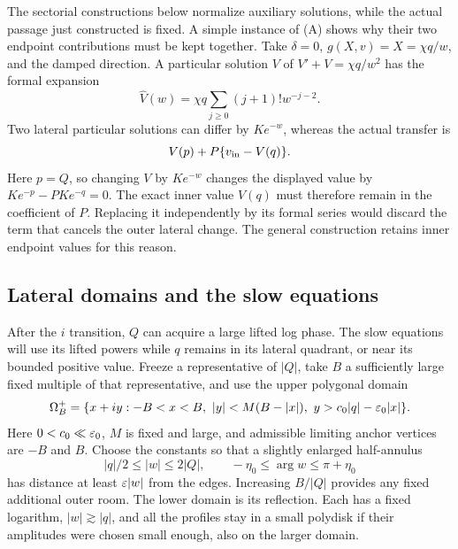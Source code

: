 The sectorial constructions below normalize auxiliary solutions, while
the actual passage just constructed is fixed.  A simple instance of (A)
shows why their two endpoint contributions must be kept together.  Take
$\delta=0$, $g(X,v)=X=\chi q/w$, and the damped direction.  A particular
solution $V$ of $V'+V=\chi q/w^2$ has the formal expansion
\[
 \widehat V(w)=\chi q\sum_{j\ge0}(j+1)!w^{-j-2}.
\]
Two lateral particular solutions can differ by $Ke^{-w}$, whereas the
actual transfer is
\begin{equation}\label{eq:additive-Stokes-cancellation}
 V(p)+P\{v_{\rm in}-V(q)\}.
\end{equation}
Here $p=Q$, so changing $V$ by $Ke^{-w}$ changes the displayed value
by $Ke^{-p}-PKe^{-q}=0$.  The exact inner value $V(q)$ must therefore
remain in the coefficient of $P$.  Replacing it independently by its
formal series would discard the term that cancels the outer lateral
change.  The general construction retains inner endpoint values for
this reason.

\subsection{Lateral domains and the slow equations}

After the $i$ transition, $Q$ can acquire a large lifted log phase.  The
slow equations will use its lifted powers while $q$ remains in its
lateral quadrant, or near its bounded positive value.  Freeze a
representative of $|Q|$, take $B$ a sufficiently large fixed multiple of
that representative, and use the upper polygonal domain
\begin{equation}\label{eq:additive-polygon}
 \Omega_B^+=\{x+iy:-B<x<B,\ |y|<M(B-|x|),\
                  y>c_0|q|-\varepsilon_0|x|\}.
\end{equation}
Here $0<c_0\ll\varepsilon_0$, $M$ is fixed and large, and admissible limiting
anchor vertices are $-B$ and $B$.  Choose the constants so that a slightly
enlarged half-annulus
\[
 |q|/2\le |w|\le 2|Q|,\qquad
 -\eta_0\le\arg w\le\pi+\eta_0
\]
has distance at least $\varepsilon|w|$ from the edges.  Increasing $B/|Q|$
provides any fixed additional outer room.  The lower domain is its
reflection.  Each has a fixed logarithm, $|w|\gtrsim|q|$, and all the
profiles stay in a small polydisk if their amplitudes were chosen small
enough, also on the larger domain.


